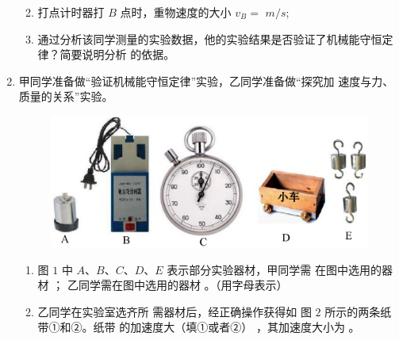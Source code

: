 \begin{enumerate}
\begin{enumerate}
\renewcommand{\labelenumi}{\arabic{enumi}.}
\item
打点计时器打 $ B $ 点时，重物速度的大小 $ v_{B} = $
$ m/s $;

\item 
通过分析该同学测量的实验数据，他的实验结果是否验证了机械能守恒定律？简要说明分析
的依据。


\end{enumerate}




\newpage
\item
{}
甲同学准备做“验证机械能守恒定律”实验，乙同学准备做“探究加
速度与力、质量的关系”实验。
\begin{figure}[h!]
\centering
\includegraphics[width=0.7\linewidth]{picture/screenshot032}
\end{figure}

\begin{enumerate}
\renewcommand{\labelenumi}{\arabic{enumi}.}
\item
图 $ 1 $ 中 $ A $、$ B $、$ C $、$ D $、$ E $
表示部分实验器材，甲同学需
在图中选用的器材  ；
乙同学需在图中选用的器材
 。（用字母表示）


\item 
乙同学在实验室选齐所
需器材后，经正确操作获得如
图 $ 2 $ 所示的两条纸带①和②。纸带  的加速度大（填①或者②）
，其加速度大小为  
。
\begin{figure}[h!]
\centering

\end{figure}




\end{enumerate}
\end{enumerate}
